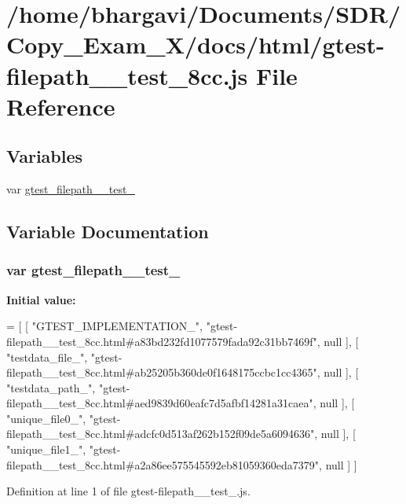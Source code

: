 \hypertarget{gtest-filepath____test__8cc_8js}{}\section{/home/bhargavi/\+Documents/\+S\+D\+R/\+Copy\+\_\+\+Exam\+\_\+X/docs/html/gtest-\/filepath\+\_\+\+\_\+test\+\_\+8cc.js File Reference}
\label{gtest-filepath____test__8cc_8js}
\subsection*{Variables}
\begin{DoxyCompactItemize}
\item 
var \hyperlink{gtest-filepath____test__8cc_8js_a4ac29fe63adaafd61304785e43b77404}{gtest\+\_\+filepath\+\_\+\+\_\+test\+\_}
\end{DoxyCompactItemize}


\subsection{Variable Documentation}
\subsubsection[{\texorpdfstring{gtest\+\_\+filepath\+\_\+\+\_\+test\+\_\+8cc}{gtest_filepath__test_8cc}}]{\setlength{\rightskip}{0pt plus 5cm}var gtest\+\_\+filepath\+\_\+\+\_\+test\+\_}\hypertarget{gtest-filepath____test__8cc_8js_a4ac29fe63adaafd61304785e43b77404}{}\label{gtest-filepath____test__8cc_8js_a4ac29fe63adaafd61304785e43b77404}
{\bfseries Initial value\+:}
\begin{DoxyCode}
=
[
    [ \textcolor{stringliteral}{"GTEST\_IMPLEMENTATION\_"}, \textcolor{stringliteral}{"gtest-filepath\_\_test\_8cc.html#a83bd232fd1077579fada92c31bb7469f"}, null ],
    [ \textcolor{stringliteral}{"testdata\_file\_"}, \textcolor{stringliteral}{"gtest-filepath\_\_test\_8cc.html#ab25205b360de0f1648175ccbc1cc4365"}, null ],
    [ \textcolor{stringliteral}{"testdata\_path\_"}, \textcolor{stringliteral}{"gtest-filepath\_\_test\_8cc.html#aed9839d60eafc7d5afbf14281a31caea"}, null ],
    [ \textcolor{stringliteral}{"unique\_file0\_"}, \textcolor{stringliteral}{"gtest-filepath\_\_test\_8cc.html#adcfc0d513af262b152f09de5a6094636"}, null ],
    [ \textcolor{stringliteral}{"unique\_file1\_"}, \textcolor{stringliteral}{"gtest-filepath\_\_test\_8cc.html#a2a86ee575545592eb81059360eda7379"}, null ]
]
\end{DoxyCode}


Definition at line 1 of file gtest-\/filepath\+\_\+\+\_\+test\+\_.\+js.

